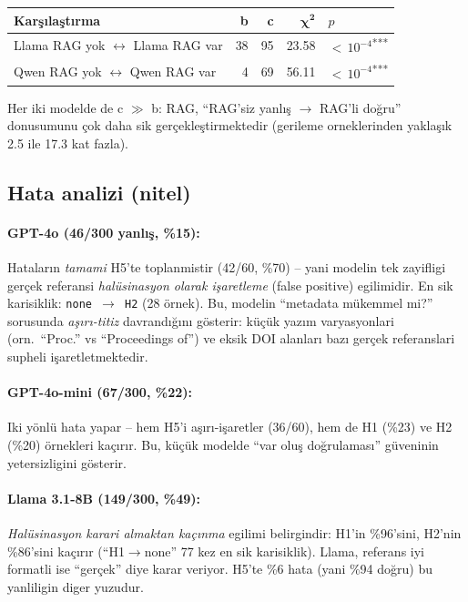 \documentclass[11pt,a4paper]{article}
\begin{document}
\begin{tabularx}{\columnwidth}{X r r r l}
\toprule
\textbf{Karşılaştırma} & \textbf{b} & \textbf{c} & $\boldsymbol{\chi^2}$ & \textbf{$p$} \\
\midrule
Llama RAG yok $\leftrightarrow$ Llama RAG var & 38 & 95 & 23.58 & ${<}\,10^{-4}$\;\textsuperscript{***} \\
Qwen RAG yok $\leftrightarrow$ Qwen RAG var   &  4 & 69 & 56.11 & ${<}\,10^{-4}$\;\textsuperscript{***} \\
\bottomrule
\end{tabularx}

\noindent Her iki modelde de c $\gg$ b: RAG, ``RAG'siz yanlış $\to$ RAG'li
doğru'' donusumunu çok daha sik gerçekleştirmektedir (gerileme orneklerinden
yaklaşık 2.5 ile 17.3 kat fazla).

\subsection{Hata analizi (nitel)}
\paragraph{GPT-4o (46/300 yanlış, \%15):} Hataların \emph{tamami} H5'te
toplanmistir (42/60, \%70) -- yani modelin tek zayifligi gerçek referansi
\emph{halüsinasyon olarak işaretleme} (false positive) egilimidir. En sik
karisiklik: \texttt{none $\to$ H2} (28 örnek). Bu, modelin ``metadata mükemmel
mi?'' sorusunda \emph{aşırı-titiz} davrandığını gösterir: küçük yazım
varyasyonlari (orn.\ ``Proc.'' vs ``Proceedings of'') ve eksik DOI alanları
bazı gerçek referanslari supheli işaretletmektedir.

\paragraph{GPT-4o-mini (67/300, \%22):} Iki yönlü hata yapar -- hem H5'i
aşırı-işaretler (36/60), hem de H1 (\%23) ve H2 (\%20) örnekleri kaçırır.
Bu, küçük modelde ``var oluş doğrulaması'' güveninin yetersizligini gösterir.

\paragraph{Llama 3.1-8B (149/300, \%49):} \emph{Halüsinasyon karari almaktan
kaçınma} egilimi belirgindir: H1'in \%96'sini, H2'nin \%86'sini kaçırır
(``H1$\to$none'' 77 kez en sik karisiklik). Llama, referans iyi formatli
ise ``gerçek'' diye karar veriyor. H5'te \%6 hata (yani \%94 doğru) bu
yanliligin diger yuzudur.
\end{document}

